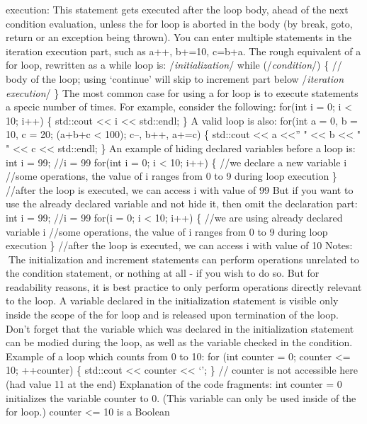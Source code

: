 execution: This statement gets executed after the loop body, ahead of
the next condition evaluation, unless the for loop is aborted in the
body (by break, goto, return or an exception being thrown). You can
enter multiple statements in the iteration execution part, such as a++,
b+=10, c=b+a. The rough equivalent of a for loop, rewritten as a while
loop is: /\emph{initialization}/ while (/\emph{condition}/) \{ // body
of the loop; using `continue' will skip to increment part below
/\emph{iteration execution}/ \} The most common case for using a for
loop is to execute statements a specic number of times. For example,
consider the following: for(int i = 0; i \textless{} 10; i++) \{
std::cout \textless\textless{} i \textless\textless{} std::endl; \} A
valid loop is also: for(int a = 0, b = 10, c = 20; (a+b+c \textless{}
100); c--, b++, a+=c) \{ std::cout \textless\textless{} a
\textless\textless{}'' " \textless\textless{} b \textless\textless{} " "
\textless\textless{} c \textless\textless{} std::endl; \} An example of
hiding declared variables before a loop is: int i = 99; //i = 99 for(int
i = 0; i \textless{} 10; i++) \{ //we declare a new variable i //some
operations, the value of i ranges from 0 to 9 during loop execution \}
//after the loop is executed, we can access i with value of 99 But if
you want to use the already declared variable and not hide it, then omit
the declaration part: int i = 99; //i = 99 for(i = 0; i \textless{} 10;
i++) \{ //we are using already declared variable i //some operations,
the value of i ranges from 0 to 9 during loop execution \} //after the
loop is executed, we can access i with value of 10 Notes: The
initialization and increment statements can perform operations unrelated
to the condition statement, or nothing at all - if you wish to do so.
But for readability reasons, it is best practice to only perform
operations directly relevant to the loop. A variable declared in the
initialization statement is visible only inside the scope of the for
loop and is released upon termination of the loop. Don't forget that the
variable which was declared in the initialization statement can be
modied during the loop, as well as the variable checked in the
condition. Example of a loop which counts from 0 to 10: for (int counter
= 0; counter \textless= 10; ++counter) \{ std::cout \textless\textless{}
counter \textless\textless{} `\n'; \} // counter is not accessible here
(had value 11 at the end) Explanation of the code fragments: int counter
= 0 initializes the variable counter to 0. (This variable can only be
used inside of the for loop.) counter \textless= 10 is a Boolean
